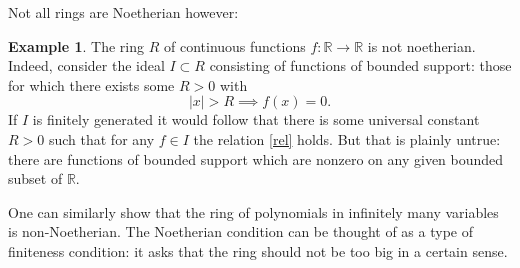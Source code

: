 \documentclass [12pt,oneside,a4paper,mathscr]{amsart}
\newtheorem{lemma}[thm]{Lemma}
\theoremstyle{definition}
\newtheorem{example}[thm]{Example}
\newcommand{\N}{\mathbb{N}}
\renewcommand{\geq}{\geqslant}
\newcommand{\R}{\mathbb{R}}
\newcommand{\Z}{\mathbb Z}
\begin{document}

Not all rings are Noetherian however:

\begin{example}
The ring $R$ of continuous functions $f\colon \R\to \R$ is not noetherian. Indeed, consider the ideal $I\subset  R$ consisting of functions of bounded support: those for which there exists some $R>0$ with
\begin{equation}
\label{rel}|x|>R \implies f(x)=0.\end{equation}
If $I$ is finitely generated it would follow that there is some universal constant $R>0$ such that for any $f\in I$ the relation \eqref{rel} holds. But that is plainly untrue: there are functions of bounded support which are nonzero on any given bounded subset of $\R$. 
\end{example}

One can similarly show that the ring of polynomials in infinitely many variables is non-Noetherian. 
The Noetherian condition can be thought of as a type of finiteness condition: it asks that the ring should not be too big in a certain sense.

%
%
\end{document}
